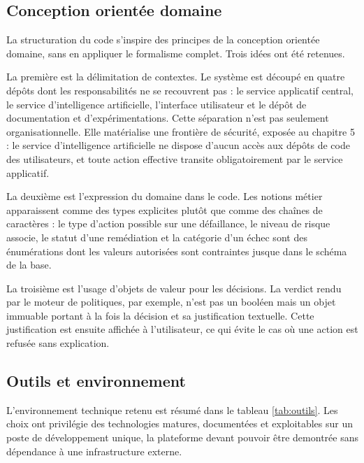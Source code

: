 \documentclass[12pt,a4paper,oneside]{report}
\begin{document}
\subsection{Conception orientée domaine}

La structuration du code s'inspire des principes de la conception orientée
domaine, sans en appliquer le formalisme complet. Trois idées ont été retenues.

La première est la délimitation de contextes. Le système est découpé en quatre
dépôts dont les responsabilités ne se recouvrent pas : le service applicatif
central, le service d'intelligence artificielle, l'interface utilisateur et le
dépôt de documentation et d'expérimentations. Cette séparation n'est pas
seulement organisationnelle. Elle matérialise une frontière de sécurité, exposée
au chapitre 5 : le service d'intelligence artificielle ne dispose d'aucun accès
aux dépôts de code des utilisateurs, et toute action effective transite
obligatoirement par le service applicatif.

La deuxième est l'expression du domaine dans le code. Les notions métier
apparaissent comme des types explicites plutôt que comme des chaînes de
caractères : le type d'action possible sur une défaillance, le niveau de risque
associe, le statut d'une remédiation et la catégorie d'un échec sont des
énumérations dont les valeurs autorisées sont contraintes jusque dans le schéma
de la base.

La troisième est l'usage d'objets de valeur pour les décisions. La verdict rendu
par le moteur de politiques, par exemple, n'est pas un booléen mais un objet
immuable portant à la fois la décision et sa justification textuelle. Cette
justification est ensuite affichée à l'utilisateur, ce qui évite le cas où une
action est refusée sans explication.

\subsection{Outils et environnement}

L'environnement technique retenu est résumé dans le tableau \ref{tab:outils}. Les
choix ont privilégie des technologies matures, documentées et exploitables sur un
poste de développement unique, la plateforme devant pouvoir être demontrée sans
dépendance à une infrastructure externe.
\end{document}
